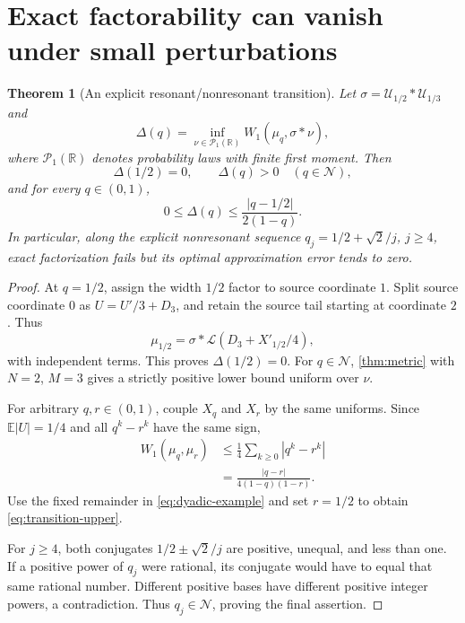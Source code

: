 \documentclass[11pt,letterpaper]{article}
\newtheorem{theorem}{Theorem}[section]
\theoremstyle{definition}
\theoremstyle{remark}
\newcommand{\R}{\mathbb R}
\newcommand{\E}{\mathbb E}
\newcommand{\Law}{\mathcal L}
\newcommand{\Un}{\mathcal U}
\newcommand{\NR}{\mathcal N}
\numberwithin{equation}{section}
\begin{document}
\section{Exact factorability can vanish under small perturbations}\label{sec:perturbation}
\begin{theorem}[An explicit resonant/nonresonant transition]\label{thm:perturbation}
Let $\sigma=\Un_{1/2}*\Un_{1/3}$ and
\[
 \Delta(q)=\inf_{\nu\in\mathcal P_1(\R)}W_1(\mu_q,\sigma*\nu),
\]
where $\mathcal P_1(\R)$ denotes probability laws with finite first moment. Then
\begin{equation}\label{eq:transition}
 \Delta(1/2)=0,\qquad \Delta(q)>0\quad(q\in\NR),
\end{equation}
and for every $q\in(0,1)$,
\begin{equation}\label{eq:transition-upper}
 0\le\Delta(q)\le\frac{|q-1/2|}{2(1-q)}.
\end{equation}
In particular, along the explicit nonresonant sequence
$q_j=1/2+\sqrt2/j$, $j\ge4$, exact factorization fails but its optimal approximation error tends to zero.
\end{theorem}
\begin{proof}
At $q=1/2$, assign the width $1/2$ factor to source coordinate $1$. Split source coordinate $0$ as $U=U'/3+D_3$, and retain the source tail starting at coordinate $2$. Thus
\begin{equation}\label{eq:dyadic-example}
 \mu_{1/2}=\sigma*\Law(D_3+X'_{1/2}/4),
\end{equation}
with independent terms. This proves $\Delta(1/2)=0$. For $q\in\NR$, \cref{thm:metric} with $N=2$, $M=3$ gives a strictly positive lower bound uniform over $\nu$.

For arbitrary $q,r\in(0,1)$, couple $X_q$ and $X_r$ by the same uniforms. Since $\E|U|=1/4$ and all $q^k-r^k$ have the same sign,
\begin{align}
 W_1(\mu_q,\mu_r)
 &\le\frac14\sum_{k\ge0}|q^k-r^k|\\
 &=\frac{|q-r|}{4(1-q)(1-r)}.\label{eq:coupling}
\end{align}
Use the fixed remainder in \eqref{eq:dyadic-example} and set $r=1/2$ to obtain \eqref{eq:transition-upper}.

For $j\ge4$, both conjugates $1/2\pm\sqrt2/j$ are positive, unequal, and less than one. If a positive power of $q_j$ were rational, its conjugate would have to equal that same rational number. Different positive bases have different positive integer powers, a contradiction. Thus $q_j\in\NR$, proving the final assertion.
\end{proof}
\end{document}
